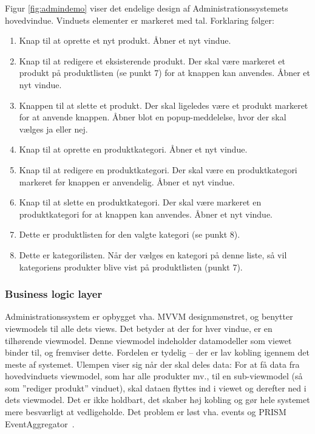 Figur \ref{fig:admindemo} viser det endelige design af Administrationssystemets hovedvindue. Vinduets elementer er markeret med tal. Forklaring følger:
\begin{enumerate}
	\item Knap til at oprette et nyt produkt. Åbner et nyt vindue.
	\item Knap til at redigere et eksisterende produkt. Der skal være markeret et produkt på produktlisten (se punkt 7) for at knappen kan anvendes. Åbner et nyt vindue.
	\item Knappen til at slette et produkt. Der skal ligeledes være et produkt markeret for at anvende knappen. Åbner blot en popup-meddelelse, hvor der skal vælges ja eller nej.
	\item Knap til at oprette en produktkategori. Åbner et nyt vindue.
	\item Knap til at redigere en produktkategori. Der skal være en produktkategori markeret før knappen er anvendelig. Åbner et nyt vindue.
	\item Knap til at slette en produktkategori. Der skal være markeret en produktkategori for at knappen kan anvendes. Åbner et nyt vindue.
	\item Dette er produktlisten for den valgte kategori (se punkt 8).
	\item Dette er kategorilisten. Når der vælges en kategori på denne liste, så vil kategoriens produkter blive vist på produktlisten (punkt 7).
\end{enumerate}

\subsubsection{Business logic layer}

Administrationssystem er opbygget vha. MVVM designmønstret, og benytter viewmodels til alle dets views. Det betyder at der for hver vindue, er en tilhørende viewmodel. Denne viewmodel indeholder datamodeller som viewet binder til, og fremviser dette. Fordelen er tydelig – der er lav kobling igennem det meste af systemet. Ulempen viser sig når der skal deles data: For at få data fra hovedvinduets viewmodel, som har alle produkter mv., til en sub-viewmodel (så som ”rediger produkt” vinduet), skal dataen flyttes ind i viewet og derefter ned i dets viewmodel. Det er ikke holdbart, det skaber høj kobling og gør hele systemet mere besværligt at vedligeholde.
Det problem er løst vha. events og PRISM EventAggregator~\cite{PRISM}.

